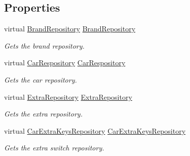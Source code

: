 \subsection*{Properties}
\begin{DoxyCompactItemize}
\item 
virtual \mbox{\hyperlink{class_car_shop_1_1_repository_1_1_brand_repository}{Brand\+Repository}} \mbox{\hyperlink{class_car_shop_1_1_repository_1_1_repository_helper_a0f0dcdc67f095a1fc6ddba82953eff74}{Brand\+Repository}}
\begin{DoxyCompactList}\small\item\em Gets the brand repository. \end{DoxyCompactList}\item 
virtual \mbox{\hyperlink{class_car_shop_1_1_repository_1_1_car_respository}{Car\+Respository}} \mbox{\hyperlink{class_car_shop_1_1_repository_1_1_repository_helper_a63ab2fcf9cae79052f747303adaabe53}{Car\+Respository}}
\begin{DoxyCompactList}\small\item\em Gets the car repository. \end{DoxyCompactList}\item 
virtual \mbox{\hyperlink{class_car_shop_1_1_repository_1_1_extra_repository}{Extra\+Repository}} \mbox{\hyperlink{class_car_shop_1_1_repository_1_1_repository_helper_af31c5cb06afd7fb40b31dd59877d9989}{Extra\+Repository}}
\begin{DoxyCompactList}\small\item\em Gets the extra repository. \end{DoxyCompactList}\item 
virtual \mbox{\hyperlink{class_car_shop_1_1_repository_1_1_car_extra_keys_repository}{Car\+Extra\+Keys\+Repository}} \mbox{\hyperlink{class_car_shop_1_1_repository_1_1_repository_helper_a75ef032d2803aee145148be976a97401}{Car\+Extra\+Keys\+Repository}}
\begin{DoxyCompactList}\small\item\em Gets the extra switch repository. \end{DoxyCompactList}\end{DoxyCompactItemize}


